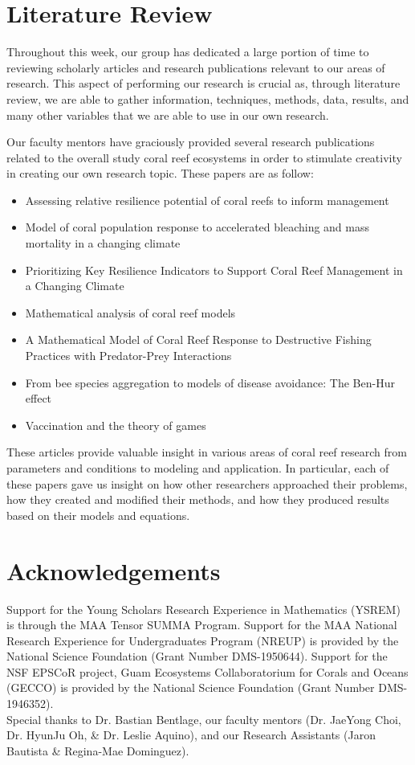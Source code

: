\documentclass[12pt]{article}
\begin{document}
\section{Literature Review}
Throughout this week, our group has dedicated a large portion of time to reviewing scholarly articles and research publications relevant to our areas of research. This aspect of performing our research is crucial as, through literature review, we are able to gather information, techniques, methods, data, results, and many other variables that we are able to use in our own research. \par
Our faculty mentors have graciously provided several research publications related to the overall study coral reef ecosystems in order to stimulate creativity in creating our own research topic. These papers are as follow:
\begin{itemize}
    \item Assessing relative resilience potential of coral reefs to inform management\cite{01_assesing_relative}
    \item Model of coral population response to accelerated bleaching and mass mortality in a changing climate\cite{02_Riegl_Purkis_Model}
    \item Prioritizing Key Resilience Indicators to Support Coral Reef Management in a Changing Climate\cite{03_prioritize}
    \item Mathematical analysis of coral reef models\cite{04_mathanalysis}
    \item A Mathematical Model of Coral Reef Response to Destructive Fishing Practices with Predator-Prey Interactions\cite{05_quintero_machuca_cotto_bradley_ríos-soto_2016}
    \item From bee species aggregation to models of disease avoidance: The Ben-Hur effect\cite{06_yong_herrera_castillo-chavez_2016}
    \item Vaccination and the theory of games\cite{07_bauch_earn_2004}
\end{itemize}
These articles provide valuable insight in various areas of coral reef research from parameters and conditions to modeling and application. In particular, each of these papers gave us insight on how other researchers approached their problems, how they created and modified their methods, and how they produced results based on their models and equations. 

\section{Acknowledgements}
Support for the Young Scholars Research Experience in Mathematics (YSREM)  is through the MAA Tensor SUMMA Program. Support for the MAA National Research Experience for Undergraduates Program (NREUP) is provided by the National Science Foundation (Grant Number DMS-1950644). Support for the NSF EPSCoR project, Guam Ecosystems Collaboratorium for Corals and Oceans (GECCO) is provided by the National Science Foundation (Grant Number DMS-1946352).\\ 

Special thanks to Dr. Bastian Bentlage, our faculty mentors (Dr. JaeYong Choi, Dr. HyunJu Oh, \& Dr. Leslie Aquino), and our Research Assistants (Jaron Bautista \& Regina-Mae Dominguez).

\newpage
% 
% 
\printbibliography
\end{document}
